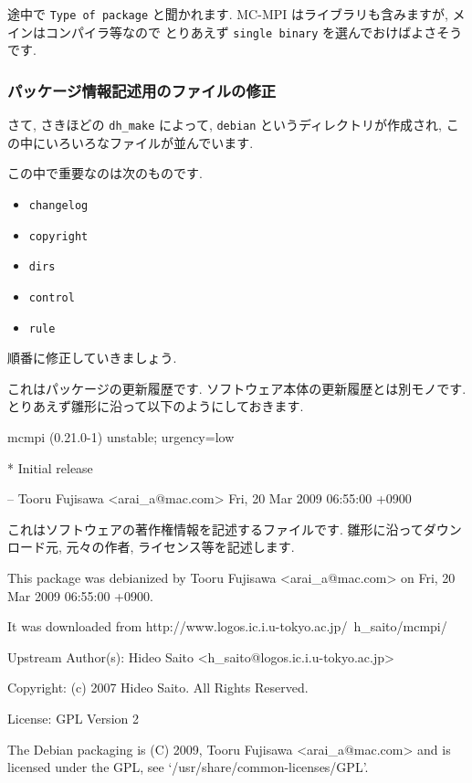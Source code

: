 \documentclass[mingoth,a4paper]{jsarticle}
\begin{document}
途中で \verb|Type of package| と聞かれます.
MC-MPI はライブラリも含みますが, メインはコンパイラ等なので
とりあえず \verb|single binary| を選んでおけばよさそうです.

\subsubsection{パッケージ情報記述用のファイルの修正}

さて, さきほどの \verb|dh_make| によって, \verb|debian| というディレクトリが作成され,
この中にいろいろなファイルが並んでいます.

この中で重要なのは次のものです.

\begin{itemize}
 \item \verb|changelog|
 \item \verb|copyright|
 \item \verb|dirs|
 \item \verb|control|
 \item \verb|rule|
\end{itemize}

順番に修正していきましょう.


これはパッケージの更新履歴です.
ソフトウェア本体の更新履歴とは別モノです.
とりあえず雛形に沿って以下のようにしておきます.

\begin{commandline}
mcmpi (0.21.0-1) unstable; urgency=low

  * Initial release

 -- Tooru Fujisawa <arai_a@mac.com>  Fri, 20 Mar 2009 06:55:00 +0900
\end{commandline}


これはソフトウェアの著作権情報を記述するファイルです.
雛形に沿ってダウンロード元, 元々の作者, ライセンス等を記述します.

\begin{commandline}
This package was debianized by Tooru Fujisawa <arai_a@mac.com> on
Fri, 20 Mar 2009 06:55:00 +0900.

It was downloaded from http://www.logos.ic.i.u-tokyo.ac.jp/~h_saito/mcmpi/

Upstream Author(s):
    Hideo Saito <h_saito@logos.ic.i.u-tokyo.ac.jp>

Copyright:
    (c) 2007 Hideo Saito. All Rights Reserved.

License:
    GPL Version 2

The Debian packaging is (C) 2009, Tooru Fujisawa <arai_a@mac.com> and
is licensed under the GPL, see `/usr/share/common-licenses/GPL'.
\end{commandline}
\end{document}
